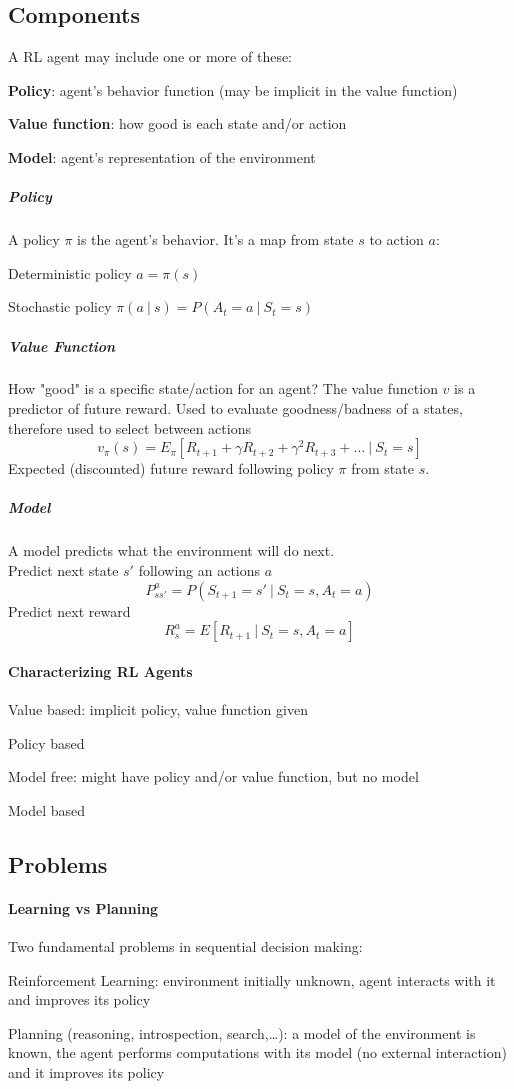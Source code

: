 \documentclass[10pt]{report}
\begin{document}
\subsection{Components}
A RL agent may include one or more of these:
\begin{list}{}{}
	\item \textbf{Policy}: agent's behavior function (may be implicit in the value function)
	\item \textbf{Value function}: how good is each state and/or action
	\item \textbf{Model}: agent's representation of the environment
\end{list}
\subparagraph{Policy} A policy $\pi$ is the agent's behavior. It's a map from state $s$ to action $a$:
\begin{list}{}{}
	\item Deterministic policy $a = \pi(s)$
	\item Stochastic policy $\pi(a\:|\:s) = P(A_t = a\:|\:S_t = s)$
\end{list}
\subparagraph{Value Function} How "good" is a specific state/action for an agent? The value function $v$ is a predictor of future reward. Used to evaluate goodness/badness of a states, therefore used to select between actions
$$v_\pi(s)= E_\pi[R_{t+1} + \gamma R_{t+2} + \gamma^2 R_{t+3} + \ldots\:|\:S_t=s]$$
Expected (discounted) future reward following policy $\pi$ from state $s$.
\subparagraph{Model} A model predicts what the environment will do next.\\
Predict next state $s'$ following an actions $a$
$$P_{ss'}^a = P(S_{t+1} = s'\:|\:S_t = s, A_t = a)$$
Predict next reward
$$R_s^a = E[R_{t+1}\:|\:S_t=s,A_t=a]$$
\paragraph{Characterizing RL Agents}\begin{list}{}{}
	\item Value based: implicit policy, value function given
	\item Policy based
	\item Model free: might have policy and/or value function, but no model
	\item Model based
\end{list}
\subsection{Problems}
\paragraph{Learning vs Planning} Two fundamental problems in sequential decision making:
\begin{list}{}{}
	\item Reinforcement Learning: environment initially unknown, agent interacts with it and improves its policy
	\item Planning (reasoning, introspection, search,\ldots): a model of the environment is known, the agent performs computations with its model (no external interaction) and it improves its policy
\end{list}
\end{document}
